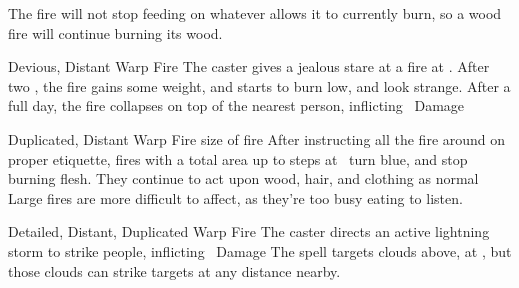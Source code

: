 \begin{multicols}{2}
{    The fire will not stop feeding on whatever allows it to currently burn, so a wood fire will continue burning its wood.}



  {Devious, Distant}%
  {Warp}%
  {Fire}%
  {}%
  {The caster gives a jealous stare at a fire at \spellRange.
  After two , the fire gains some weight, and starts to burn low, and look strange.
  After a full day, the fire collapses on top of the nearest person, inflicting \showDam~Damage}%
  {}

  {Duplicated, Distant}%
  {Warp}%
  {Fire}%
  {size of fire}%
  {After instructing all the fire around on proper etiquette, fires with a total area up to  \glspl{step} at \spellRange\ turn blue, and stop burning flesh.
  They continue to act upon wood, hair, and clothing as normal}%
  {Large fires are more difficult to affect, as they're too busy eating to listen.}

  {Detailed, Distant, Duplicated}%
  {Warp}%
  {Fire}%
  {}%
  {The caster directs an active lightning storm to strike  people, inflicting \showDam\ Damage}%
  {The spell targets clouds above, at \spellRange, but those clouds can strike targets at any distance nearby.}


% 
\iftoggle{intro}{}{
  \subsection{Earth}
  \label{earthSpells}

  \showSpells{Earth1}

  \showSpells{Earth1}

  \showSpells{Earth2}

  \showSpells{Earth2}

  \spell{Mud Clamp}%
    {Duplicated, Detailed}%
    {Wax}%
    {Earth}%
    {\roll{Strength}{Survival}}%
    {The caster shouts `\textit{hold fast}', as snow or mud becomes solid, encasing any feet pushed into the ground.
    Targets then count as \textit{Entangled}}%
    {
    The spell suffers a -2~Penalty when used against creatures without flat feet (such as hooves, or most other animal feet), but can also gain up to a +2~Bonus in particularly deep mud or snow.}

}
\end{multicols}
